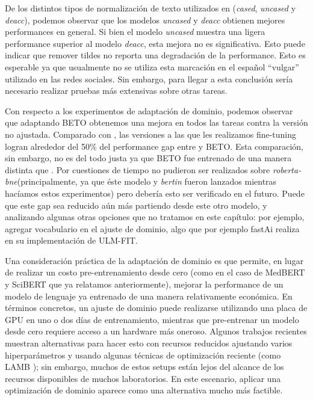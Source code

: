 De los distintos tipos de normalización de texto utilizados en \robertuito{} (\emph{cased}, \emph{uncased} y \emph{deacc}), podemos observar que los modelos \emph{uncased} y \emph{deacc} obtienen mejores performances en general. Si bien el modelo \emph{uncased} muestra una ligera performance superior al modelo \emph{deacc}, esta mejora no es significativa. Esto puede indicar que remover tildes no reporta una degradación de la performance. Esto es esperable ya que usualmente no se utiliza esta marcación en el español ``vulgar'' utilizado en las redes sociales. Sin embargo, para llegar a esta conclusión sería necesario realizar pruebas más extensivas sobre otras tareas.

Con respecto a los experimentos de adaptación de dominio, podemos observar que adaptando BETO obtenemos una mejora en todos las tareas contra la versión no ajustada. Comparado con \robertuito{}, las versiones a las que les realizamos fine-tuning logran alrededor del 50\% del performance gap entre \robertuito{} y BETO. Esta comparación, sin embargo, no es del todo justa ya que BETO fue entrenado de una manera distinta que \robertuito{}. Por cuestiones de tiempo no pudieron ser realizados sobre \emph{roberta-bne}(principalmente, ya que éste modelo y \emph{bertin} fueron lanzados mientras hacíamos estos experimentos) pero debería esto ser verificado en el futuro. Puede que este gap sea reducido aún más partiendo desde este otro modelo, y analizando algunas otras opciones que no tratamos en este capítulo: por ejemplo, agregar vocabulario en el ajuste de dominio, algo que por ejemplo fastAi realiza en su implementación de ULM-FIT.

Una consideración práctica de la adaptación de dominio es que permite, en lugar de realizar un costo pre-entrenamiento desde cero (como en el caso de MedBERT y SciBERT que ya relatamos anteriormente), mejorar la performance de un modelo de lenguaje ya entrenado de una manera relativamente económica. En términos concretos, un ajuste de dominio puede realizarse utilizando una placa de GPU en uno o dos días de entrenamiento, mientras que pre-entrenar un modelo desde cero requiere acceso a un hardware más oneroso. Algunos trabajos recientes \cite{izsak2021train} muestran alternativas para hacer esto con recursos reducidos ajustando varios hiperparámetros y usando algunas técnicas de optimización reciente (como LAMB \cite{you2019large}); sin embargo, muchos de estos setups están lejos del alcance de los recursos disponibles de muchos laboratorios. En este escenario, aplicar una optimización de dominio aparece como una alternativa mucho más factible.

